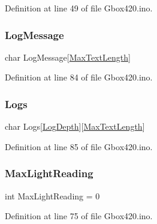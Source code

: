 Definition at line 49 of file Gbox420.\+ino.

\mbox{\label{_gbox420_8ino_aaec8722cf3c8a9f79cc8f7eef3e777e2}} 
\subsubsection{\texorpdfstring{LogMessage}{LogMessage}}
{\footnotesize\ttfamily char Log\+Message\mbox{[}\mbox{\hyperlink{420_settings_8h_a1b8e1e4d41c8b790a064405b0c219a6c}{Max\+Text\+Length}}\mbox{]}}



Definition at line 84 of file Gbox420.\+ino.

\mbox{\label{_gbox420_8ino_a5ff6182d5779c7a6035f51cf6f3504f2}} 
\subsubsection{\texorpdfstring{Logs}{Logs}}
{\footnotesize\ttfamily char Logs\mbox{[}\mbox{\hyperlink{420_settings_8h_ab2ccf5621e9f5893516bcc5657df9b84}{Log\+Depth}}\mbox{]}\mbox{[}\mbox{\hyperlink{420_settings_8h_a1b8e1e4d41c8b790a064405b0c219a6c}{Max\+Text\+Length}}\mbox{]}}



Definition at line 85 of file Gbox420.\+ino.

\mbox{\label{_gbox420_8ino_ab2dbf4d376ea2f1ca361ceac772656c2}} 
\subsubsection{\texorpdfstring{MaxLightReading}{MaxLightReading}}
{\footnotesize\ttfamily int Max\+Light\+Reading = 0}



Definition at line 75 of file Gbox420.\+ino.

\mbox{\label{_gbox420_8ino_ac9093761e17ca6ebc97951a68d93b06b}} 
